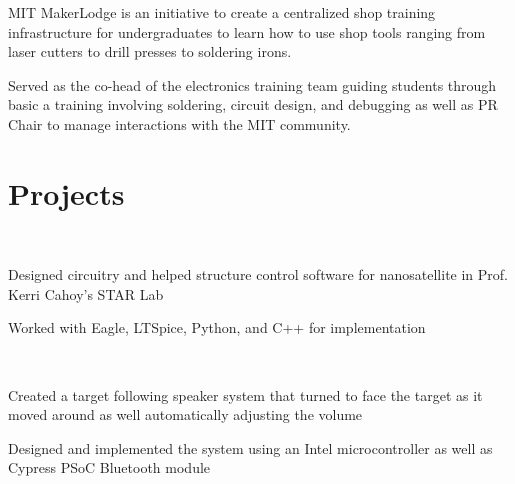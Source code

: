 \documentclass[letterpaper, article]{deedy-resume-openfont}
\begin{document}
\begin{minipage}[t]{0.66\textwidth}

\begin{tightemize}
	\item MIT MakerLodge is an initiative to create a centralized shop training infrastructure for undergraduates to learn how to use shop tools ranging from laser cutters to drill presses to soldering irons.
	\item Served as the co-head of the electronics training team guiding students through basic a training involving soldering, circuit design, and debugging as well as PR Chair to manage interactions with the MIT community.
\end{tightemize}


\section{Projects}
\\
\begin{tightemize}
	\item Designed circuitry and helped structure control software for nanosatellite in Prof. Kerri Cahoy's STAR Lab
	\item Worked with Eagle, LTSpice, Python, and C++ for implementation
\end{tightemize}

\\
\begin{tightemize}
	\item Created a target following speaker system that turned to face the target as it moved around as well automatically adjusting the volume
	\item Designed and implemented the system using an Intel microcontroller as well as Cypress PSoC Bluetooth module
\end{tightemize}


\end{minipage}
\end{document}
